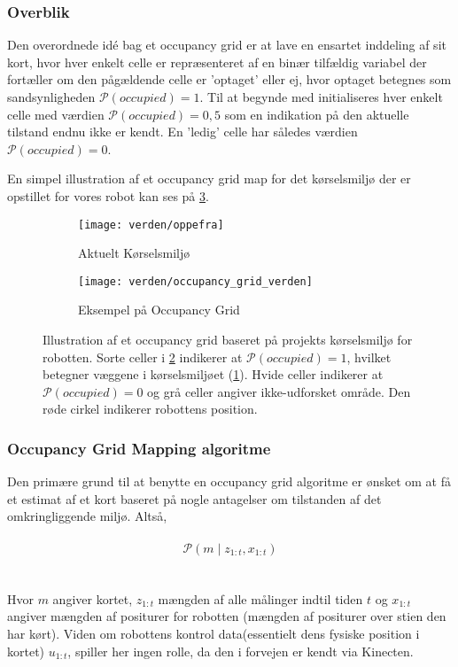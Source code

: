 \subsubsection{Overblik}
Den overordnede idé bag et occupancy grid er at lave en ensartet inddeling af sit kort, hvor hver enkelt celle er repræsenteret af en binær tilfældig variabel der fortæller om den pågældende celle er 'optaget' eller ej, hvor optaget betegnes som sandsynligheden $\mathcal{P}(occupied) = 1$.
Til at begynde med initialiseres hver enkelt celle med værdien $\mathcal{P}(occupied) = 0,5$ som en indikation på den aktuelle tilstand endnu ikke er kendt.
En 'ledig' celle har således værdien $\mathcal{P}(occupied) = 0$.

En simpel illustration af et occupancy grid map for det kørselsmiljø der er opstillet for vores robot kan ses på \cref{map:approx_occupancy_grid}.

\begin{figure}[h] %
\centering
	\begin{subfigure}[b]{.45\textwidth}
	\centering
	\texttt{[image: verden/oppefra]}
	\caption{Aktuelt Kørselsmiljø}
	\label{map:world}
	\end{subfigure}
	\begin{subfigure}[b]{.45\textwidth}
	\centering
	\texttt{[image: verden/occupancy\_grid\_verden]}
	\caption{Eksempel på Occupancy Grid}
	\label{map:occupancy_grid}
	\end{subfigure}
\caption{Illustration af et occupancy grid baseret på projekts kørselsmiljø for robotten. Sorte celler i \cref{map:occupancy_grid} indikerer at $\mathcal{P}(occupied) = 1$, hvilket betegner væggene i kørselsmiljøet (\cref{map:world}). Hvide celler indikerer at $\mathcal{P}(occupied) = 0$ og grå celler angiver ikke-udforsket område. Den røde cirkel indikerer robottens position.}
\label{map:approx_occupancy_grid}
\end{figure}

\subsubsection{Occupancy Grid Mapping algoritme}
Den primære grund til at benytte en occupancy grid algoritme er ønsket om at få et estimat af et kort baseret på nogle antagelser om tilstanden af det omkringliggende miljø. Altså,
\\\\
\begin{equation}
\mathcal{P}(m \; | \; z_{1:t}, x_{1:t})
\end{equation}
\\\\
Hvor $m$ angiver kortet, $z_{1:t}$ mængden af alle målinger indtil tiden $t$ og $x_{1:t}$ angiver mængden af positurer for robotten (mængden af positurer over stien den har kørt).
Viden om robottens kontrol data(essentielt dens fysiske position i kortet) $u_{1:t}$, spiller her ingen rolle, da den i forvejen er kendt via Kinecten.\cite{probabilisticRobotics}

